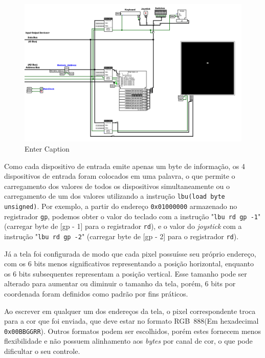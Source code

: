 \documentclass[
	12pt,				%
	openright,			%
	oneside,			%
	a4paper,			%
	english,			%
	french,				%
	spanish,			%
	brazil,				%
	]{abntex2}
\begin{document}
\begin{figure}[h]
    \centering
    \includegraphics[width=1\linewidth]{ProcessoDesenvolvimento/Arquitetura/NewIOLogisim.png}
    \caption{Enter Caption}
    \label{fig:NewIOLogisim}
\end{figure}

Como cada dispositivo de entrada emite apenas um byte de informação, os 4 dispositivos de entrada foram colocados em uma palavra, o que permite o carregamento dos valores de todos os dispositivos simultaneamente ou o carregamento de um dos valores utilizando a instrução \texttt{lbu(load byte unsigned)}. Por exemplo, a partir do endereço \texttt{0x01000000} armazenado no registrador \texttt{gp}, podemos obter o valor do teclado com a instrução "\texttt{lbu~rd~gp~-1}" (carregar byte de [gp - 1] para o registrador \texttt{rd}), e o valor do \textit{joystick} com a instrução "\texttt{lbu~rd~gp~-2}" (carregar byte de [gp - 2] para o registrador \texttt{rd}).

Já a tela foi configurada de modo que cada pixel possuísse seu próprio endereço, com os 6 bits menos significativos representando a posição horizontal, enquanto os 6 bits subsequentes representam a posição vertical. Esse tamanho pode ser alterado para aumentar ou diminuir o tamanho da tela, porém, 6 bits por coordenada foram definidos como padrão por fins práticos. 

Ao escrever em qualquer um dos endereços da tela, o pixel correspondente troca para a cor que foi enviada, que deve estar no formato RGB~888(Em hexadecimal \texttt{0x00BBGGRR}). Outros formatos podem ser escolhidos, porém estes fornecem menos flexibilidade e não possuem alinhamento aos \textit{bytes} por canal de cor, o que pode dificultar o seu controle.
\end{document}

